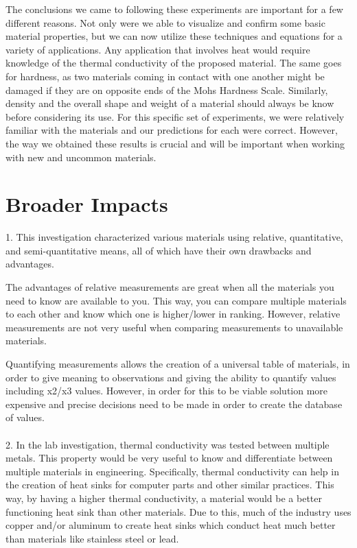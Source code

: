\documentclass{article}
\begin{document}
The conclusions we came to following these experiments are important for a few different reasons. Not only were we able to visualize and confirm some basic material properties, but we can now utilize these techniques and equations for a variety of applications. Any application that involves heat would require knowledge of the thermal conductivity of the proposed material. The same goes for hardness, as two materials coming in contact with one another might be damaged if they are on opposite ends of the Mohs Hardness Scale. Similarly, density and the overall shape and weight of a material should always be know before considering its use. For this specific set of experiments, we were relatively familiar with the materials and our predictions for each were correct. However, the way we obtained these results is crucial and will be important when working with new and uncommon materials.

\section{Broader Impacts}
1. This investigation characterized various materials using relative, quantitative, and semi-quantitative means, all of which have their own drawbacks and advantages. 

The advantages of relative measurements are great when all the materials you need to know are available to you. This way, you can compare multiple materials to each other and know which one is higher/lower in ranking. However, relative measurements are not very useful when comparing measurements to unavailable materials. 

Quantifying measurements allows the creation of a universal table of materials, in order to give meaning to observations and giving the ability to quantify values including x2/x3 values. However, in order for this to be viable solution more expensive and precise decisions need to be made in order to create the database of values. 
\paragraph{}
2. In the lab investigation, thermal conductivity was tested between multiple metals. This property would be very useful to know and differentiate between multiple materials in engineering. Specifically, thermal conductivity can help in the creation of heat sinks for computer parts and other similar practices. This way, by having a higher thermal conductivity, a material would be a better functioning heat sink than other materials. Due to this, much of the industry uses copper and/or aluminum to create heat sinks which conduct heat much better than materials like stainless steel or lead.
\end{document}
